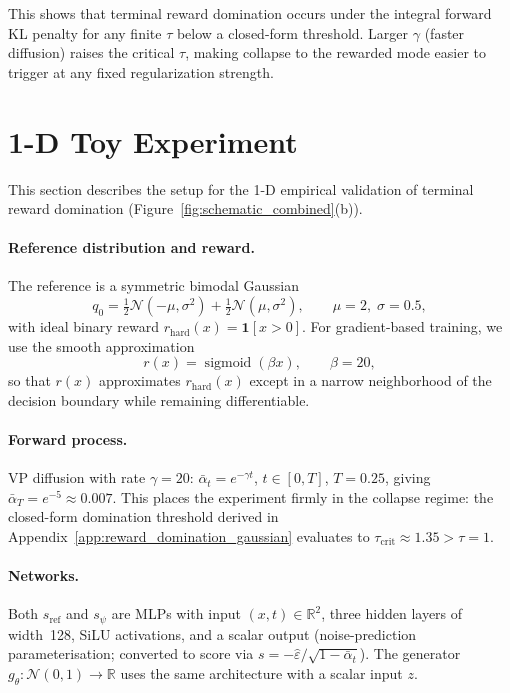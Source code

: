 This shows that terminal reward domination occurs under the integral forward KL penalty for any finite $\tau$ below a closed-form threshold. Larger $\gamma$ (faster diffusion) raises the critical $\tau$, making collapse to the rewarded mode easier to trigger at any fixed regularization strength.

\section{1-D Toy Experiment}
\label{app:toy_experiment}

This section describes the setup for the 1-D empirical validation of terminal reward domination (Figure~\ref{fig:schematic_combined}(b)).

\paragraph{Reference distribution and reward.}
The reference is a symmetric bimodal Gaussian
\[
q_0 = \tfrac{1}{2}\mathcal{N}(-\mu,\sigma^2) + \tfrac{1}{2}\mathcal{N}(\mu,\sigma^2), \qquad \mu=2,\;\sigma=0.5,
\]
with ideal binary reward $r_{\mathrm{hard}}(x)=\mathbf{1}[x>0]$. For gradient-based training, we use the smooth approximation
\[
r(x)=\operatorname{sigmoid}(\beta x), \qquad \beta=20,
\]
so that $r(x)$ approximates $r_{\mathrm{hard}}(x)$ except in a narrow neighborhood of the decision boundary while remaining differentiable.

\paragraph{Forward process.}
VP diffusion with rate $\gamma=20$: $\bar\alpha_t=e^{-\gamma t}$, $t\in[0,T]$, $T=0.25$, giving $\bar\alpha_T=e^{-5}\approx0.007$. This places the experiment firmly in the collapse regime: the closed-form domination threshold derived in Appendix~\ref{app:reward_domination_gaussian} evaluates to $\tau_{\mathrm{crit}}\approx1.35>\tau=1$.

\paragraph{Networks.}
Both $s_{\mathrm{ref}}$ and $s_\psi$ are MLPs with input $(x,t)\in\mathbb{R}^2$, three hidden layers of width~128, SiLU activations, and a scalar output (noise-prediction parameterisation; converted to score via $s=-\hat{\varepsilon}/\sqrt{1-\bar\alpha_t}$).
The generator $g_\theta:\mathcal{N}(0,1)\to\mathbb{R}$ uses the same architecture with a scalar input $z$.

